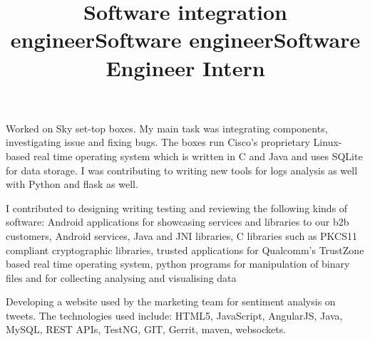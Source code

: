 \begin{resume}
        \title{Software integration engineer}
        \begin{position}
            Worked on Sky set-top boxes.
            My main task was integrating components, investigating issue and fixing bugs.
            The boxes run Cisco's proprietary Linux-based real time operating system which is written in C and Java
            and uses SQLite for data storage.
            I was contributing to writing new tools for logs analysis as well with Python and flask as well.
        \end{position}

        \title{Software engineer}
        \begin{position}
            I contributed to designing writing testing and reviewing the following kinds of software:
            Android applications for showcasing services and libraries to our b2b customers,
            Android services,
            Java and JNI libraries,
            C libraries such as PKCS11 compliant cryptographic libraries,
            trusted applications for Qualcomm's TrustZone based real time operating system,
            python programs for manipulation of binary files and for collecting analysing and visualising data


        \end{position}

        \title{Software Engineer Intern}
        \begin{position}
            Developing a website used by the marketing team for sentiment analysis on tweets.
            The technologies used include: HTML5, JavaScript, AngularJS, Java, MySQL, REST APIs, TestNG, GIT, Gerrit, maven, websockets.
        \end{position}



\end{resume}
